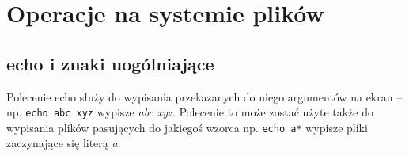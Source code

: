 % 
% 
% 
% 

\section{Operacje na systemie plików}

\subsection{echo i znaki uogólniające}

Polecenie echo służy do wypisania przekazanych do niego argumentów na ekran – np. \Verb$echo abc xyz$ wypisze \textit{abc xyz}.
Polecenie to może zostać użyte także do wypisania plików pasujących do jakiegoś wzorca np. \Verb$echo a*$ wypisze pliki zaczynające się literą \textit{a}.

